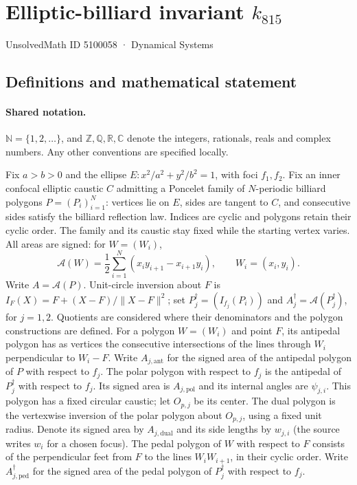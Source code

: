 \documentclass[11pt]{article}
\begin{document}
\setcounter{section}{5100057}
\section{Elliptic-billiard invariant $k_{815}$}\label{5100058}
{\small\sffamily UnsolvedMath ID 5100058 · Dynamical Systems}
\subsection{Definitions and mathematical statement}

\paragraph{Shared notation.}$\mathbb N=\{1,2,\ldots\}$, and $\mathbb Z,\mathbb Q,\mathbb R,\mathbb C$ denote the integers, rationals, reals and complex numbers. Any other conventions are specified locally.


Fix $a>b>0$ and the ellipse $E:x^2/a^2+y^2/b^2=1$, with foci $f_1,f_2$. Fix an inner confocal elliptic caustic $C$ admitting a Poncelet family of $N$-periodic billiard polygons $P=(P_i)_{i=1}^N$: vertices lie on $E$, sides are tangent to $C$, and consecutive sides satisfy the billiard reflection law. Indices are cyclic and polygons retain their cyclic order. The family and its caustic stay fixed while the starting vertex varies. All areas are signed: for $W=(W_i)$,
\[\mathcal A(W)=\frac12\sum_{i=1}^N(x_i y_{i+1}-x_{i+1}y_i),\qquad W_i=(x_i,y_i).\]
Write $A=\mathcal A(P)$. Unit-circle inversion about $F$ is $I_F(X)=F+(X-F)/\lVert X-F\rVert^2$; set $P_j^\dagger=(I_{f_j}(P_i))$ and $A_j^\dagger=\mathcal A(P_j^\dagger)$, for $j=1,2$. Quotients are considered where their denominators and the polygon constructions are defined. For a polygon $W=(W_i)$ and point $F$, its antipedal polygon has as vertices the consecutive intersections of the lines through $W_i$ perpendicular to $W_i-F$. Write $A_{j,\mathrm{ant}}$ for the signed area of the antipedal polygon of $P$ with respect to $f_j$. The polar polygon with respect to $f_j$ is the antipedal of $P_j^\dagger$ with respect to $f_j$. Its signed area is $A_{j,\mathrm{pol}}$ and its internal angles are $\psi_{j,i}$. This polygon has a fixed circular caustic; let $O_{p,j}$ be its center. The dual polygon is the vertexwise inversion of the polar polygon about $O_{p,j}$, using a fixed unit radius. Denote its signed area by $A_{j,\mathrm{dual}}$ and its side lengths by $w_{j,i}$ (the source writes $w_i$ for a chosen focus). The pedal polygon of $W$ with respect to $F$ consists of the perpendicular feet from $F$ to the lines $W_iW_{i+1}$, in their cyclic order. Write $A_{j,\mathrm{ped}}^\dagger$ for the signed area of the pedal polygon of $P_j^\dagger$ with respect to $f_j$.
\end{document}
